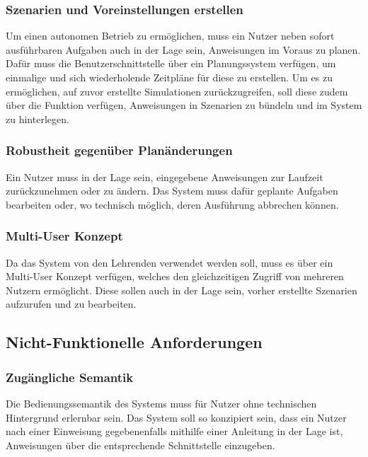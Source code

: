 \subsubsection{Szenarien und Voreinstellungen erstellen}

Um einen autonomen Betrieb zu ermöglichen, muss ein Nutzer neben sofort ausführbaren Aufgaben auch in der Lage sein, Anweisungen im Voraus zu planen. Dafür muss die Benutzerschnittstelle über ein Planungssystem verfügen, um einmalige und sich wiederholende Zeitpläne für diese zu erstellen. Um es zu ermöglichen, auf zuvor erstellte Simulationen zurückzugreifen, soll diese zudem über die Funktion verfügen, Anweisungen in Szenarien zu bündeln und im System zu hinterlegen.

	
\subsubsection{Robustheit gegenüber Planänderungen}

Ein Nutzer muss in der Lage sein, eingegebene Anweisungen zur Laufzeit zurückzunehmen oder zu ändern. Das System muss dafür geplante Aufgaben bearbeiten oder, wo technisch möglich, deren Ausführung abbrechen können.


\subsubsection{Multi-User Konzept}

Da das System von den Lehrenden verwendet werden soll, muss es über ein Multi-User Konzept verfügen, welches den gleichzeitigen Zugriff von mehreren Nutzern ermöglicht. Diese sollen auch in der Lage sein, vorher erstellte Szenarien aufzurufen und zu bearbeiten.


\subsection{Nicht-Funktionelle Anforderungen}

\subsubsection{Zugängliche Semantik}

Die Bedienungssemantik des Systems muss für Nutzer ohne technischen Hintergrund erlernbar sein. Das System soll so konzipiert sein, dass ein Nutzer nach einer Einweisung gegebenenfalls mithilfe einer Anleitung in der Lage ist, Anweisungen über die entsprechende Schnittstelle einzugeben.


